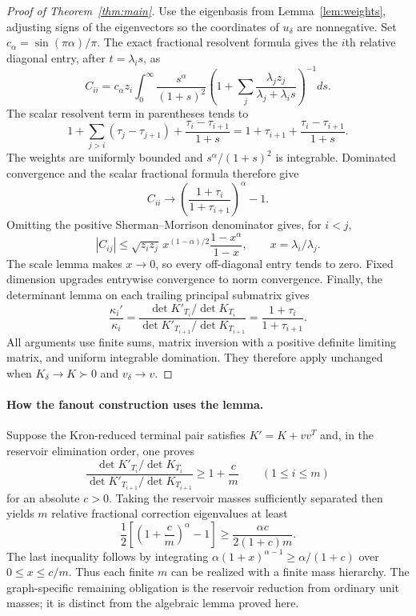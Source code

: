 \documentclass[11pt]{article}
\begin{document}
\begin{proof}[Proof of Theorem~\ref{thm:main}]
Use the eigenbasis from Lemma~\ref{lem:weights}, adjusting signs of
the eigenvectors so the coordinates of $u_\delta$ are nonnegative.
Set $c_\alpha=\sin(\pi\alpha)/\pi$. The exact fractional resolvent
formula gives the $i$th relative diagonal entry, after $t=\lambda_i s$,
as
\[
 C_{ii}=c_\alpha z_i\int_0^\infty\frac{s^\alpha}{(1+s)^2}
 \left(1+\sum_j\frac{\lambda_j z_j}{\lambda_j+\lambda_i s}\right)^{-1}ds.
\]
The scalar resolvent term in parentheses tends to
\[
 1+\sum_{j>i}(\tau_j-\tau_{j+1})
        +\frac{\tau_i-\tau_{i+1}}{1+s}
 =1+\tau_{i+1}+\frac{\tau_i-\tau_{i+1}}{1+s}.
\]
The weights are uniformly bounded and $s^\alpha/(1+s)^2$ is integrable.
Dominated convergence and the scalar fractional formula therefore give
\[
 C_{ii}\longrightarrow
 \left(\frac{1+\tau_i}{1+\tau_{i+1}}\right)^\alpha-1.
\]
Omitting the positive Sherman--Morrison denominator gives, for $i<j$,
\[
 |C_{ij}|\le\sqrt{z_iz_j}\,x^{(1-\alpha)/2}
                     \frac{1-x^\alpha}{1-x},\qquad x=\lambda_i/\lambda_j.
\]
The scale lemma makes $x\to0$, so every off-diagonal entry tends to
zero. Fixed dimension upgrades entrywise convergence to norm convergence.
Finally, the determinant lemma on each trailing principal submatrix gives
\[
 \frac{\kappa_i'}{\kappa_i}
 =\frac{\det K'_{T_i}/\det K_{T_i}}
        {\det K'_{T_{i+1}}/\det K_{T_{i+1}}}
 =\frac{1+\tau_i}{1+\tau_{i+1}}.
\]
All arguments use finite sums, matrix inversion with a positive
definite limiting matrix, and uniform integrable domination. They
therefore apply unchanged when $K_\delta\to K\succ0$ and
$v_\delta\to v$.
\end{proof}

\paragraph{How the fanout construction uses the lemma.}
Suppose the Kron-reduced terminal pair satisfies $K'=K+vv^T$ and,
in the reservoir elimination order, one proves
\[
 \frac{\det K'_{T_i}/\det K_{T_i}}
      {\det K'_{T_{i+1}}/\det K_{T_{i+1}}}
       \ge1+\frac{c}{m}
       \qquad(1\le i\le m)
\]
for an absolute $c>0$. Taking the reservoir masses sufficiently
separated then yields $m$ relative fractional correction eigenvalues
at least
\[
 \frac12\left[\left(1+\frac cm\right)^\alpha-1\right]
       \ge\frac{\alpha c}{2(1+c)m}.
\]
The last inequality follows by integrating
$\alpha(1+x)^{\alpha-1}\ge\alpha/(1+c)$ over $0\le x\le c/m$.
Thus each finite $m$ can be realized with a finite mass hierarchy.
The graph-specific remaining obligation is the reservoir reduction
from ordinary unit masses; it is distinct from the algebraic lemma
proved here.
\end{document}
